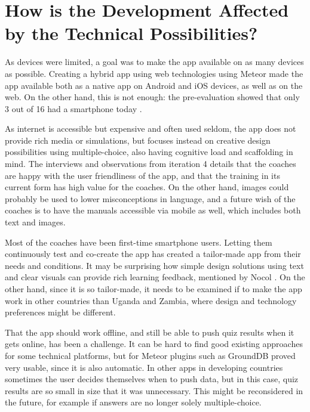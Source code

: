 \section{How is the Development Affected by the Technical Possibilities?}

As devices were limited, a goal was to make the app available on as many devices as possible. Creating a hybrid app using web technologies using Meteor made the app available both as a native app on Android and iOS devices, as well as on the web. On the other hand, this is not enough: the pre-evaluation showed that only 3 out of 16 had a smartphone today \citep{youngdrive-statistics}.

As internet is accessible but expensive and often used seldom, the app does not provide rich media or simulations, but focuses instead on creative design possibilities using multiple-choice, also having cognitive load and scaffolding in mind. The interviews and observations from iteration 4 details that the coaches are happy with the user friendliness of the app, and that the training in its current form has high value for the coaches. On the other hand, images could probably be used to lower misconceptions in language, and a future wish of the coaches is to have the manuals accessible via mobile as well, which includes both text and images.

Most of the coaches have been first-time smartphone users. Letting them continuously test and co-create the app has created a tailor-made app from their needs and conditions. It may be surprising how simple design solutions using text and clear visuals can provide rich learning feedback, mentioned by Nocol \cite{nicol}. On the other hand, since it is so tailor-made, it needs to be examined if to make the app work in other countries than Uganda and Zambia, where design and technology preferences might be different.

That the app should work offline, and still be able to push quiz results when it gets online, has been a challenge. It can be hard to find good existing approaches for some technical platforms, but for Meteor plugins such as GroundDB proved very usable, since it is also automatic. In other apps in developing countries sometimes the user decides themselves when to push data, but in this case, quiz results are so small in size that it was unnecessary. This might be reconsidered in the future, for example if answers are no longer solely multiple-choice.

